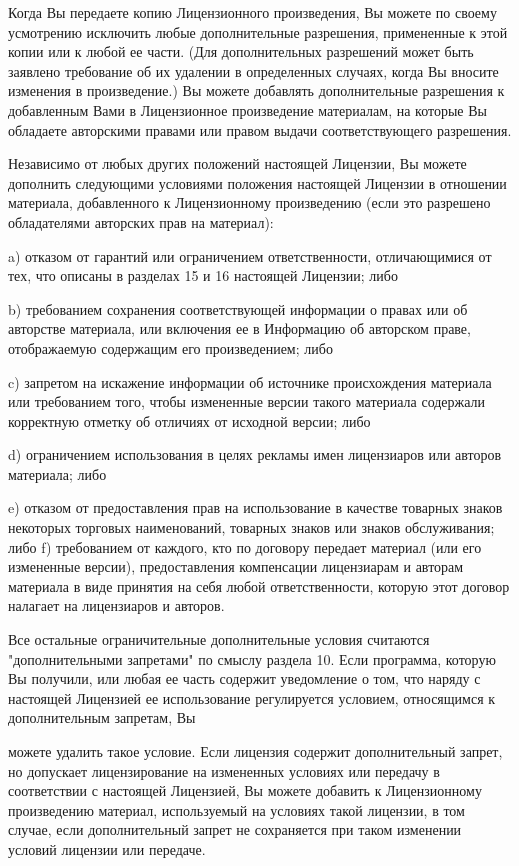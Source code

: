 Когда Вы передаете копию Лицензионного произведения, Вы можете по своему усмотрению исключить любые дополнительные разрешения, примененные к этой копии или к любой ее части. (Для дополнительных разрешений может быть заявлено требование об их удалении в определенных случаях, когда Вы вносите изменения в произведение.) Вы можете добавлять дополнительные разрешения к добавленным Вами в Лицензионное произведение материалам, на которые Вы обладаете авторскими правами или правом выдачи соответствующего разрешения.

Независимо от любых других положений настоящей Лицензии, Вы можете дополнить следующими условиями положения настоящей Лицензии в отношении материала, добавленного к Лицензионному произведению (если это разрешено обладателями авторских прав на материал)\+:

a) отказом от гарантий или ограничением ответственности, отличающимися от тех, что описаны в разделах 15 и 16 настоящей Лицензии; либо

b) требованием сохранения соответствующей информации о правах или об авторстве материала, или включения ее в Информацию об авторском праве, отображаемую содержащим его произведением; либо

c) запретом на искажение информации об источнике происхождения материала или требованием того, чтобы измененные версии такого материала содержали корректную отметку об отличиях от исходной версии; либо

d) ограничением использования в целях рекламы имен лицензиаров или авторов материала; либо

e) отказом от предоставления прав на использование в качестве товарных знаков некоторых торговых наименований, товарных знаков или знаков обслуживания; либо f) требованием от каждого, кто по договору передает материал (или его измененные версии), предоставления компенсации лицензиарам и авторам материала в виде принятия на себя любой ответственности, которую этот договор налагает на лицензиаров и авторов.

Все остальные ограничительные дополнительные условия считаются "{}дополнительными запретами"{} по смыслу раздела 10. Если программа, которую Вы получили, или любая ее часть содержит уведомление о том, что наряду с настоящей Лицензией ее использование регулируется условием, относящимся к дополнительным запретам, Вы

можете удалить такое условие. Если лицензия содержит дополнительный запрет, но допускает лицензирование на измененных условиях или передачу в соответствии с настоящей Лицензией, Вы можете добавить к Лицензионному произведению материал, используемый на условиях такой лицензии, в том случае, если дополнительный запрет не сохраняется при таком изменении условий лицензии или передаче.

